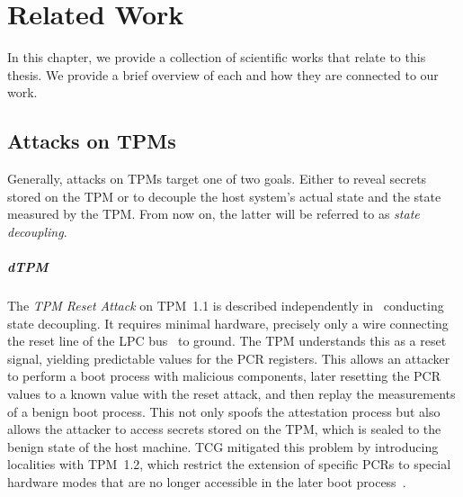 
\chapter{Related Work}\label{chapter:related_work}

In this chapter, we provide a collection of scientific works that relate to this thesis.
We provide a brief overview of each and how they are connected to our work.

\section{Attacks on TPMs}

Generally, attacks on \acp{TPM} target one of two goals.
Either to reveal secrets stored on the \ac{TPM} or to decouple the host system's actual state and the state measured by the \ac{TPM}\@.
From now on, the latter will be referred to as \emph{state decoupling}.




\paragraph{\Acl{dTPM}}

The \emph{TPM Reset Attack} on TPM~1.1 is described independently in~\cite{kauerBernhard,sparks2007} conducting state decoupling.
It requires minimal hardware, precisely only a wire connecting the reset line of the LPC bus~\cite{lpc} to ground.
The TPM understands this as a reset signal, yielding predictable values for the \ac{PCR} registers.
This allows an attacker to perform a boot process with malicious components, later resetting the \ac{PCR} values to a known value with the reset attack, and then replay the measurements of a benign boot process.
This not only spoofs the attestation process but also allows the attacker to access secrets stored on the TPM, which is sealed to the benign state of the host machine.
\Ac{TCG} mitigated this problem by introducing localities with TPM~1.2, which restrict the extension of specific \acp{PCR} to special hardware modes that are no longer accessible in the later boot process~\cite{Proskurin2016}.

